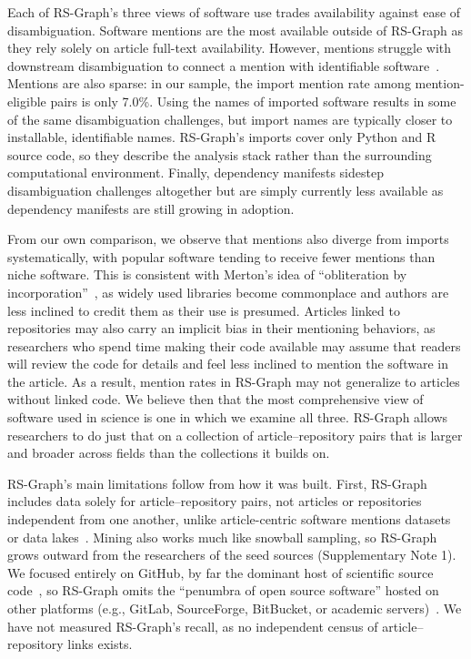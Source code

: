 \documentclass[pdflatex,sn-nature]{sn-jnl}%
\begin{document}
Each of RS-Graph's three views of software use trades availability against ease of disambiguation. Software mentions are the most available outside of RS-Graph as they rely solely on article full-text availability. However, mentions struggle with downstream disambiguation to connect a mention with identifiable software~\cite{druskat2024dontmention,brown2026biomedical}. Mentions are also sparse: in our sample, the import mention rate among mention-eligible pairs is only 7.0\%. Using the names of imported software results in some of the same disambiguation challenges, but import names are typically closer to installable, identifiable names. RS-Graph's imports cover only Python and R source code, so they describe the analysis stack rather than the surrounding computational environment. Finally, dependency manifests sidestep disambiguation challenges altogether but are simply currently less available as dependency manifests are still growing in adoption.

From our own comparison, we observe that mentions also diverge from imports systematically, with popular software tending to receive fewer mentions than niche software. This is consistent with Merton's idea of ``obliteration by incorporation''~\cite{merton1968social}, as widely used libraries become commonplace and authors are less inclined to credit them as their use is presumed. Articles linked to repositories may also carry an implicit bias in their mentioning behaviors, as researchers who spend time making their code available may assume that readers will review the code for details and feel less inclined to mention the software in the article. As a result, mention rates in RS-Graph may not generalize to articles without linked code. We believe then that the most comprehensive view of software used in science is one in which we examine all three. RS-Graph allows researchers to do just that on a collection of article--repository pairs that is larger and broader across fields than the collections it builds on.

RS-Graph's main limitations follow from how it was built. First, RS-Graph includes data solely for article--repository pairs, not articles or repositories independent from one another, unlike article-centric software mentions datasets or data lakes~\cite{wilinski2026science}. Mining also works much like snowball sampling, so RS-Graph grows outward from the researchers of the seed sources (Supplementary Note 1). We focused entirely on GitHub, by far the dominant host of scientific source code~\cite{escamilla2022rise,cao2023rise}, so RS-Graph omits the ``penumbra of open source software'' hosted on other platforms (e.g., GitLab, SourceForge, BitBucket, or academic servers)~\cite{trujillo2022penumbra}. We have not measured RS-Graph's recall, as no independent census of article--repository links exists.
\end{document}
